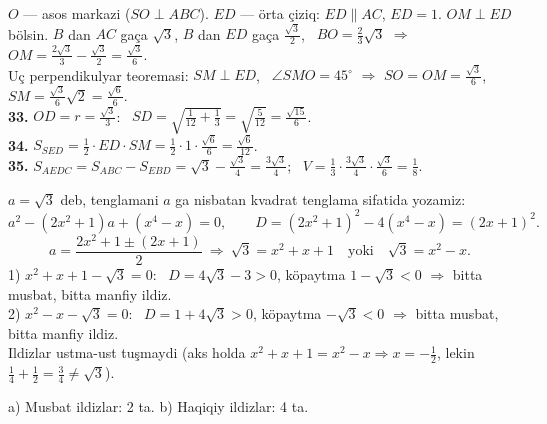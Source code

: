 \newpage
{}
$O$ — asos markazi ($SO\perp ABC$). $ED$ — örta çiziq: $ED\parallel AC$, $ED=1$. $OM\perp ED$ bölsin.
$B$ dan $AC$ gaça $\sqrt3$, $B$ dan $ED$ gaça $\frac{\sqrt3}2$, \ $BO=\frac23\sqrt3$ $\Rightarrow$ $OM=\frac{2\sqrt3}3-\frac{\sqrt3}2=\frac{\sqrt3}6$.\\
Uç perpendikulyar teoremasi: $SM\perp ED$, \ $\angle SMO=45^\circ$ $\Rightarrow$ $SO=OM=\frac{\sqrt3}6$, \ $SM=\frac{\sqrt3}6\sqrt2=\frac{\sqrt6}6$.\\
\textbf{33.} $OD=r=\frac{\sqrt3}3$: \ $SD=\sqrt{\frac1{12}+\frac13}=\sqrt{\frac5{12}}=\frac{\sqrt{15}}6$.\\
\textbf{34.} $S_{SED}=\frac12\cdot ED\cdot SM=\frac12\cdot1\cdot\frac{\sqrt6}6=\frac{\sqrt6}{12}$.\\
\textbf{35.} $S_{AEDC}=S_{ABC}-S_{EBD}=\sqrt3-\frac{\sqrt3}4=\frac{3\sqrt3}4$; \ $V=\frac13\cdot\frac{3\sqrt3}4\cdot\frac{\sqrt3}6=\frac18$.

\newpage
{}
$a=\sqrt3$ deb, tenglamani $a$ ga nisbatan kvadrat tenglama sifatida yozamiz:
\[a^2-(2x^2+1)a+(x^4-x)=0,\qquad D=(2x^2+1)^2-4(x^4-x)=(2x+1)^2.\]
\[a=\frac{2x^2+1\pm(2x+1)}2\ \Rightarrow\ \sqrt3=x^2+x+1\quad\text{yoki}\quad\sqrt3=x^2-x.\]
1) $x^2+x+1-\sqrt3=0$: \ $D=4\sqrt3-3>0$, köpaytma $1-\sqrt3<0$ $\Rightarrow$ bitta musbat, bitta manfiy ildiz.\\
2) $x^2-x-\sqrt3=0$: \ $D=1+4\sqrt3>0$, köpaytma $-\sqrt3<0$ $\Rightarrow$ bitta musbat, bitta manfiy ildiz.\\
Ildizlar ustma-ust tuşmaydi (aks holda $x^2+x+1=x^2-x\Rightarrow x=-\frac12$, lekin $\frac14+\frac12=\frac34\ne\sqrt3$).

a) Musbat ildizlar: 2 ta. \qquad b) Haqiqiy ildizlar: 4 ta.

